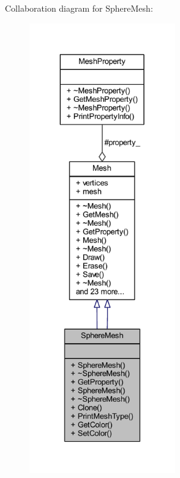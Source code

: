 Collaboration diagram for Sphere\+Mesh\+:\nopagebreak
\begin{figure}[H]
\begin{center}
\leavevmode
\includegraphics[height=550pt]{class_sphere_mesh__coll__graph}
\end{center}
\end{figure}
